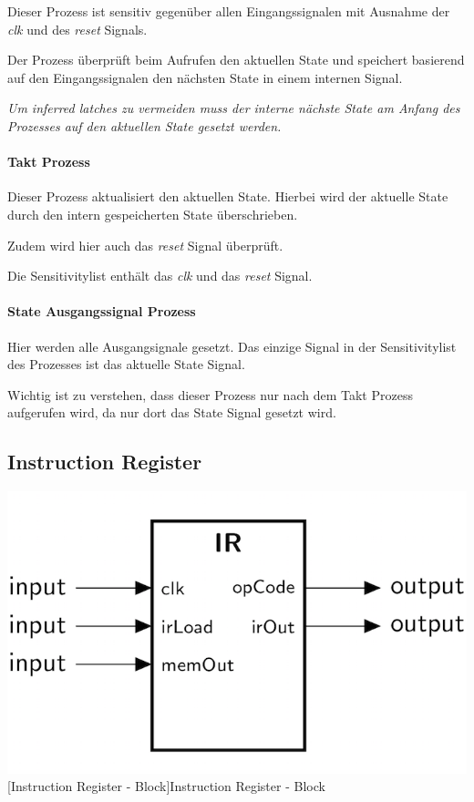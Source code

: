 Dieser Prozess ist sensitiv gegenüber allen Eingangssignalen mit Ausnahme der \emph{clk} und des \emph{reset} Signals.

Der Prozess überprüft beim Aufrufen den aktuellen State und speichert basierend auf den Eingangssignalen den nächsten State in einem internen Signal.

\emph{Um inferred latches zu vermeiden muss der interne nächste State am Anfang des Prozesses auf den aktuellen State gesetzt werden.}

\paragraph{Takt Prozess}

Dieser Prozess aktualisiert den aktuellen State. Hierbei wird der aktuelle State durch den intern gespeicherten State überschrieben.

Zudem wird hier auch das \emph{reset} Signal überprüft.

Die Sensitivitylist enthält das \emph{clk} und das \emph{reset} Signal.

\paragraph{State Ausgangssignal Prozess}

Hier werden alle Ausgangsignale gesetzt. Das einzige Signal in der Sensitivitylist des Prozesses ist das aktuelle State Signal.

Wichtig ist zu verstehen, dass dieser Prozess nur nach dem Takt Prozess aufgerufen wird, da nur dort das State Signal gesetzt wird.


\pagebreak
\subsection{Instruction Register}

\vspace{1em}
\begin{minipage}{\linewidth}
    \centering
    \includegraphics[width=0.4\linewidth]{images/IR.png}\\
    [Instruction Register - Block]{Instruction Register - Block}
    \label{fig:ir_block}
\end{minipage}

